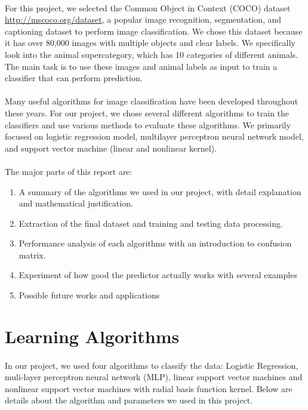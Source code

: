 \documentclass{article}
\begin{document}
\paragraph{}
For this project, we selected the Common Object in Context (COCO) dataset \url{http://mscoco.org/dataset}, a popular image recognition, segmentation, and captioning dataset to perform image classification. We chose this dataset because it has over 80,000 images with multiple objects and clear labels. We specifically look into the animal supercategory, which has 10 categories of different animals. The main task is to use these images and animal labels as input to train a classifier that can perform prediction.
\paragraph{}
Many useful algorithms for image classification have been developed throughout these years. For our project, we chose several different algorithms to train the classifiers and use various methods to evaluate these algorithms. We primarily focused on logistic regression model, multilayer perceptron neural network model, and support vector machine (linear and nonlinear kernel).
 
\paragraph{}
The major parts of this report are:
\begin{enumerate}
\item 
A summary of the algorithms we used in our project, with detail explanation and mathematical justification.
\item 
Extraction of the final dataset and training and testing data processing.
\item 
Performance analysis of each algorithms with an introduction to confusion matrix.
\item 
Experiment of how good the predictor actually works with several examples
\item 
Possible future works and applications
\end{enumerate}

\section{Learning Algorithms}
\paragraph{}
In our project, we used four algorithms to classify the data: Logistic Regression, muli-layer perceptron neural network (MLP), linear support vector machines and nonlinear support vector machines with radial basis function kernel. Below are details about the algorithm and parameters we used in this project. 
\end{document}
